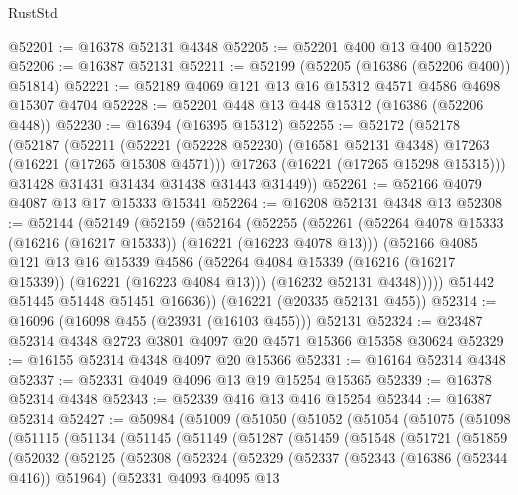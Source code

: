 \begin{lexlean}{RustStd}
\begin{coremodule}
@52201 := @16378 @52131 @4348
@52205 := @52201 @400 @13 @400 @15220
@52206 := @16387 @52131
@52211 := @52199 (@52205 (@16386 (@52206 @400)) @51814)
@52221 := @52189 @4069 @121 @13 @16 @15312 @4571 @4586 @4698 @15307 @4704
@52228 := @52201 @448 @13 @448 @15312 (@16386 (@52206 @448))
@52230 := @16394 (@16395 @15312)
@52255 := @52172
    (@52178
      (@52187
        (@52211
          (@52221 (@52228 @52230) (@16581 @52131 @4348) @17263 (@16221 (@17265 @15308 @4571)))
          @17263
          (@16221 (@17265 @15298 @15315)))
        @31428
        @31431
        @31434
        @31438
        @31443
        @31449))
@52261 := @52166 @4079 @4087 @13 @17 @15333 @15341
@52264 := @16208 @52131 @4348 @13
@52308 := @52144
    (@52149
      (@52159
        (@52164
          (@52255
            (@52261
              (@52264 @4078 @15333 (@16216 (@16217 @15333)) (@16221 (@16223 @4078 @13)))
              (@52166
                @4085
                @121
                @13
                @16
                @15339
                @4586
                (@52264 @4084 @15339 (@16216 (@16217 @15339)) (@16221 (@16223 @4084 @13)))
                (@16232 @52131 @4348)))))
        @51442
        @51445
        @51448
        @51451
        @16636))
    (@16221 (@20335 @52131 @455))
@52314 := @16096 (@16098 @455 (@23931 (@16103 @455))) @52131
@52324 := @23487 @52314 @4348 @2723 @3801 @4097 @20 @4571 @15366 @15358 @30624
@52329 := @16155 @52314 @4348 @4097 @20 @15366
@52331 := @16164 @52314 @4348
@52337 := @52331 @4049 @4096 @13 @19 @15254 @15365
@52339 := @16378 @52314 @4348
@52343 := @52339 @416 @13 @416 @15254
@52344 := @16387 @52314
@52427 := @50984
    (@51009
      (@51050
        (@51052
          (@51054
            (@51075
              (@51098
                (@51115
                  (@51134
                    (@51145
                      (@51149
                        (@51287
                          (@51459
                            (@51548
                              (@51721
                                (@51859
                                  (@52032
                                    (@52125
                                      (@52308
                                        (@52324
                                          (@52329
                                            (@52337
                                              (@52343 (@16386 (@52344 @416)) @51964)
                                              (@52331
                                                @4093
                                                @4095
                                                @13

\end{coremodule}
\end{lexlean}
